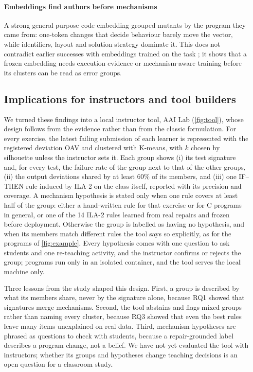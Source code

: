 \documentclass[a4paper,preprint,12pt,authoryear]{elsarticle}
\begin{document}
\paragraph{Embeddings find authors before mechanisms}
A strong general-purpose code embedding grouped mutants by the program they came from: one-token changes that decide behaviour barely move the vector, while identifiers, layout and solution strategy dominate it. This does not contradict earlier successes with embeddings trained on the task \citep{shi2021misconception,piech2015embeddings}; it shows that a frozen embedding needs execution evidence or mechanism-aware training before its clusters can be read as error groups.

\subsection{Implications for instructors and tool builders}\label{sec:tool}
We turned these findings into a local instructor tool, AAI Lab (\cref{fig:tool}), whose design follows from the evidence rather than from the classic formulation. For every exercise, the latest failing submission of each learner is represented with the registered deviation OAV and clustered with K-means, with $k$ chosen by silhouette unless the instructor sets it. Each group shows (i) its test signature and, for every test, the failure rate of the group next to that of the other groups, (ii) the output deviations shared by at least 60\% of its members, and (iii) one IF--THEN rule induced by ILA-2 on the class itself, reported with its precision and coverage. A mechanism hypothesis is stated only when one rule covers at least half of the group: either a hand-written rule for that exercise or for C programs in general, or one of the 14 ILA-2 rules learned from real repairs and frozen before deployment. Otherwise the group is labelled as having no hypothesis, and when its members match different rules the tool says so explicitly, as for the programs of \cref{fig:example}. Every hypothesis comes with one question to ask students and one re-teaching activity, and the instructor confirms or rejects the group; programs run only in an isolated container, and the tool serves the local machine only.

Three lessons from the study shaped this design. First, a group is described by what its members share, never by the signature alone, because RQ1 showed that signatures merge mechanisms. Second, the tool abstains and flags mixed groups rather than naming every cluster, because RQ3 showed that even the best rules leave many items unexplained on real data. Third, mechanism hypotheses are phrased as questions to check with students, because a repair-grounded label describes a program change, not a belief. We have not yet evaluated the tool with instructors; whether its groups and hypotheses change teaching decisions is an open question for a classroom study.
\end{document}
